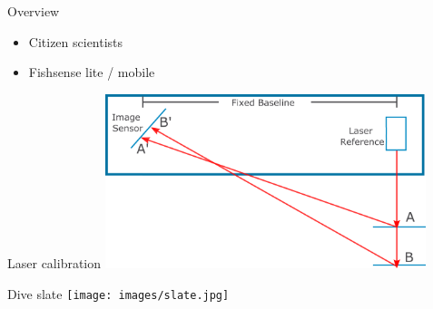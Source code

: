 
\begin{frame}{Overview}
    \begin{itemize}
        \item Citizen scientists
        \item Fishsense lite / mobile
    \end{itemize}  
\end{frame}

\begin{frame}{Laser calibration}
    \centering
    \includegraphics[height=0.7\textheight,width=0.7\textwidth,keepaspectratio]{images/fs_triangulation.png}
\end{frame}

\begin{frame}{Dive slate}
    \centering
    \texttt{[image: images/slate.jpg]}
\end{frame}

